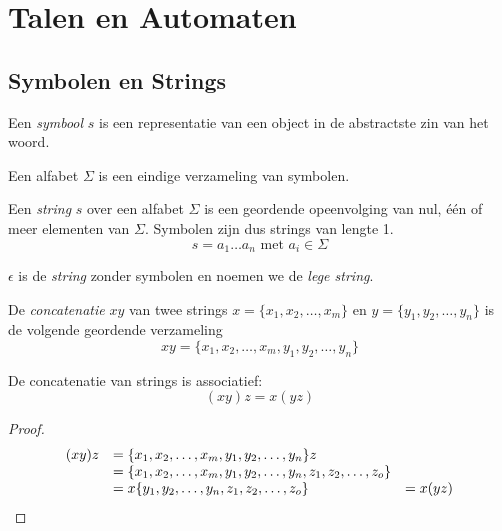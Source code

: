 \documentclass[main.tex]{subfiles}
\begin{document}
\chapter{Talen en Automaten}
\label{cha:talen-en-automaten}

\section{Symbolen en Strings}
\label{sec:symbolen-en-strings}

\begin{de}
  Een \emph{symbool} $s$ is een representatie van een object in de abstractste zin van het woord. 
\end{de}

\begin{de}
  Een alfabet $\Sigma$ is een eindige verzameling van symbolen.
\end{de}

\begin{de}
  Een \emph{string} $s$ over een alfabet $\Sigma$ is een geordende opeenvolging van nul, \'e\'en of meer elementen van $\Sigma$. Symbolen zijn dus strings van lengte 1.
  \[ s = a_{1}\ldots a_{n} \text{ met } a_{i} \in \Sigma \]
\end{de}

\begin{de}
  $\epsilon$ is de \emph{string} zonder symbolen en noemen we de \emph{lege string}.
\end{de}


\begin{de}
  De \emph{concatenatie} $xy$ van twee strings $x = \{x_1,x_2,\ldots,x_m\}$ en $y =   \{y_1,y_2,\ldots,y_n\}$ is de volgende geordende verzameling  
  \[
  xy = \{ x_1,x_2,\ldots,x_m,y_1,y_2,\ldots,y_n\}
  \] 
\end{de}

\begin{ei}
  De concatenatie van strings is associatief:
  \[
  (xy)z = x(yz)
  \]

  \begin{proof}
    \[
    \begin{array}{r l l}
      (xy)z &= \{x_1,x_2,\ldots,x_m,y_1,y_2,\ldots,y_n\}z &\\
            &= \{x_1,x_2,\ldots,x_m,y_1,y_2,\ldots,y_n,z_1,z_2,\ldots,z_o\} &\\
            &= x\{y_1,y_2,\ldots,y_n,z_1,z_2,\ldots,z_o\} &= x(yz)
    \end{array}
    \]
  \end{proof}
\end{ei}
\end{document}
